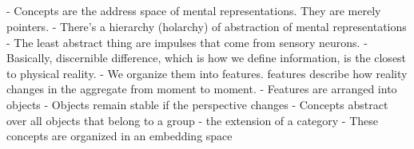 \subsection{}
- Concepts are the address space of mental representations. They are merely pointers. 
- There's a hierarchy (holarchy) of abstraction of mental representations
- The least abstract thing are impulses that come from sensory neurons. 
- Basically, discernible difference, which is how we define information, is the closest to physical reality.
- We organize them into features. features describe how reality changes in the aggregate from moment to moment.
- Features are arranged into objects
- Objects remain stable if the perspective changes
- Concepts abstract over all objects that belong to a group - the extension of a category
- These concepts are organized in an embedding space  







